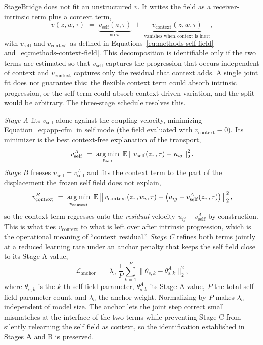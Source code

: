 StageBridge does not fit an unstructured $v$. It writes the field as a receiver-intrinsic term plus a
context term,
\begin{equation}\label{eq:app-decomp}
v(z, w, \tau) \;=\; \underbrace{v_{\mathrm{self}}(z, \tau)}_{\text{no }w}
\;+\; \underbrace{v_{\mathrm{context}}(z, w, \tau)}_{\text{vanishes when context is inert}} ,
\end{equation}
with $v_{\mathrm{self}}$ and $v_{\mathrm{context}}$ as defined in
Equations~\ref{eq:methods-self-field} and~\ref{eq:methods-context-field}. This decomposition is identifiable only if the two terms
are estimated so that $v_{\mathrm{self}}$ captures the progression that occurs independent of context
and $v_{\mathrm{context}}$ captures only the residual that context adds. A single joint fit does not
guarantee this: the flexible context term could absorb intrinsic progression, or the self term could
absorb context-driven variation, and the split would be arbitrary. The three-stage schedule resolves
this.

\emph{Stage A} fits $v_{\mathrm{self}}$ alone against the coupling velocity, minimizing
Equation~\ref{eq:app-cfm} in self mode (the field evaluated with $v_{\mathrm{context}} \equiv 0$). Its
minimizer is the best context-free explanation of the transport,
\begin{equation}\label{eq:app-stageA}
v_{\mathrm{self}}^{A} \;=\; \operatorname*{arg\,min}_{v_{\mathrm{self}}}\ \mathbb{E}
\left\lVert\, v_{\mathrm{self}}(z_\tau, \tau) - u_{ij} \,\right\rVert_2^2 .
\end{equation}
\emph{Stage B} freezes $v_{\mathrm{self}} = v_{\mathrm{self}}^{A}$ and fits the context term to the
part of the displacement the frozen self field does not explain,
\begin{equation}\label{eq:app-stageB}
v_{\mathrm{context}}^{B} \;=\; \argmin_{v_{\mathrm{context}}}\ \mathbb{E}
\left\lVert\, v_{\mathrm{context}}(z_\tau, w_i, \tau) - \bigl(u_{ij} - v_{\mathrm{self}}^{A}(z_\tau, \tau)\bigr) \,\right\rVert_2^2 ,
\end{equation}
so the context term regresses onto the \emph{residual} velocity $u_{ij} - v_{\mathrm{self}}^{A}$ by
construction. This is what ties $v_{\mathrm{context}}$ to what is left over after intrinsic progression,
which is the operational meaning of ``context residual.'' \emph{Stage C} refines both terms jointly at
a reduced learning rate under an anchor penalty that keeps the self field close to its Stage-A value,
\begin{equation}\label{eq:app-anchor}
\mathcal{L}_{\mathrm{anchor}} \;=\; \lambda_a\, \frac{1}{P}\sum_{k=1}^{P}
\bigl\lVert \theta_{s,k} - \theta_{s,k}^{A} \bigr\rVert_2^2 ,
\end{equation}
where $\theta_{s,k}$ is the $k$-th self-field parameter, $\theta_{s,k}^{A}$ its Stage-A value, $P$ the
total self-field parameter count, and $\lambda_a$ the anchor weight. Normalizing by $P$ makes
$\lambda_a$ independent of model size. The anchor lets the joint step correct small mismatches at the
interface of the two terms while preventing Stage C from silently relearning the self field as context,
so the identification established in Stages A and B is preserved.

